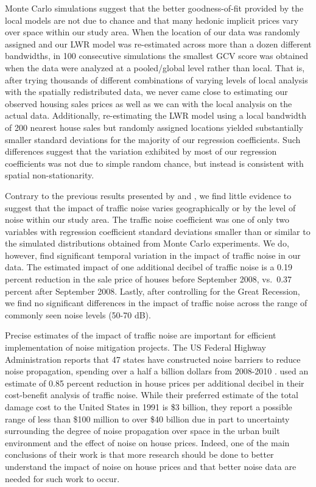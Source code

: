 \documentclass{article}\usepackage[]{graphicx}\usepackage[]{color}
\begin{document}
Monte Carlo simulations suggest that the better goodness-of-fit provided by the local models are not due to chance and that many hedonic implicit prices vary over space within our study area. When the location of our data was randomly assigned and our LWR model was re-estimated across more than a dozen different bandwidths, in 100 consecutive simulations the smallest GCV score was obtained when the data were analyzed at a pooled/global level rather than local. That is, after trying thousands of different combinations of varying levels of local analysis with the spatially redistributed data, we never came close to estimating our observed housing sales prices as well as we can with the local analysis on the actual data. Additionally, re-estimating the LWR model using a local bandwidth of 200 nearest house sales but randomly assigned locations yielded substantially smaller standard deviations for the majority of our regression coefficients. Such differences suggest that the variation exhibited by most of our regression coefficients was not due to simple random chance, but instead is consistent with spatial non-stationarity. 

Contrary to the previous results presented by \citet{MarmolejoDuarteCarlos;GonzalezTamez2009} and \citet{Theebe2004a}, we find little evidence to suggest that the impact of traffic noise varies geographically or by the level of noise within our study area. The traffic noise coefficient was one of only two variables with regression coefficient standard deviations smaller than or similar to the simulated distributions obtained from Monte Carlo experiments. We do, however, find significant temporal variation in the impact of traffic noise in our data. The estimated impact of one additional decibel of traffic noise is a 0.19 percent reduction in the sale price of houses before September 2008, vs.\ 0.37 percent after September 2008. Lastly, after controlling for the Great Recession, we find no significant differences in the impact of traffic noise across the range of commonly seen noise levels (50-70 dB).

Precise estimates of the impact of traffic noise are important for efficient implementation of noise mitigation projects. The US Federal Highway Administration reports that 47 states have constructed noise barriers to reduce noise propagation, spending over a half a billion dollars from 2008-2010 . \citet{Delucchi1998} used an estimate of 0.85 percent reduction in house prices per additional decibel in their cost-benefit analysis of traffic noise. While their preferred estimate of the total damage cost to the United States in 1991 is \$3 billion, they report a possible range of less than \$100 million to over \$40 billion due in part to uncertainty surrounding the degree of noise propagation over space in the urban built environment and the effect of noise on house prices. Indeed, one of the main conclusions of their work is that more research should be done to better understand the impact of noise on house prices and that better noise data are needed for such work to occur. 
\end{document}
